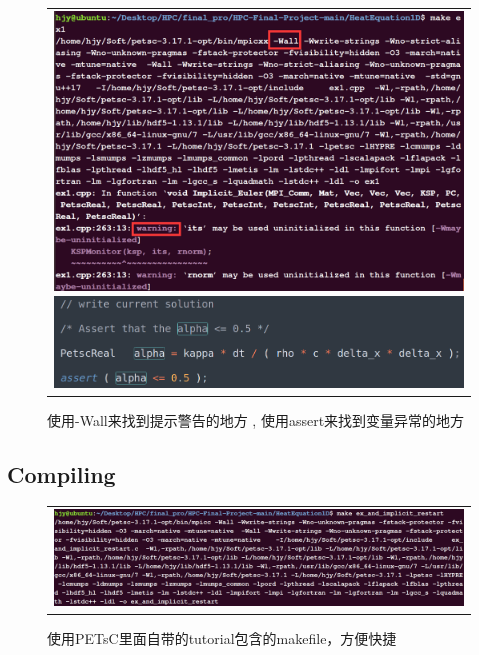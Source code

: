 \documentclass[3p]{elsarticle}
\numberwithin{equation}{section}
\begin{document}
    \begin{figure}[h]
    	\begin{center}
    		\begin{tabular}{c}
    			\includegraphics[angle=0, scale=0.16]{./figures/warning.png}
    			\includegraphics[angle=0, scale=0.30]{./figures/assert.png}
    		\end{tabular}
    	\end{center}
    	\caption{使用-Wall来找到提示警告的地方 , 使用assert来找到变量异常的地方}
    	\label{fig:illustration-warning}
    \end{figure}

    \clearpage
    \subsection{Compiling}
    
    \begin{figure}[h]
    	\begin{center}
    		\begin{tabular}{c}
    			\includegraphics[angle=0, scale=0.28]{./figures/compile.png}
    		\end{tabular}
    	\end{center}
    	\caption{使用PETsC里面自带的tutorial包含的makefile，方便快捷}
    	\label{fig:illustration-compile}
    \end{figure}
    
\end{document}
